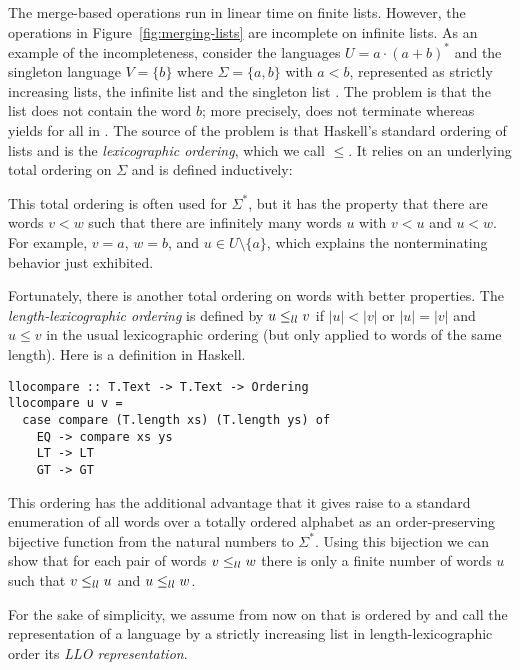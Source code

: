 The merge-based operations run in linear time on finite
lists. However, the operations in Figure~\ref{fig:merging-lists} are
incomplete on infinite lists. As 
an example of the incompleteness, consider the languages $U = a\cdot
(a+b)^*$ and the singleton language $V = \{b\}$ where $\Sigma = \{a, b\}$
with $a<b$, represented as strictly increasing lists, the infinite
list  and the singleton list . The problem is that
the list  does not contain the word $b$; more
precisely,  does not
terminate whereas  yields  for
all  in . The source 
of the problem is that Haskell's standard ordering of lists and
 is the \emph{lexicographic ordering}, which we call
$\le$. It relies on an underlying total ordering on $\Sigma$ and is
defined inductively:
\begin{mathpar}
  

\end{mathpar}

This total ordering
is often used for $\Sigma^*$, but it has the property that
there are words $v<w$ such that there are infinitely many words $u$
with $v<u$ and $u<w$. For example, $v=a$, $w=b$, and $u\in U \setminus
\{a\}$, which explains the nonterminating behavior just exhibited.

Fortunately, there is another total ordering on words with better
properties. The
\emph{length-lexicographic ordering} is defined by $u \lleq 
v$ if $|u|<|v|$ or $|u|=|v|$ and $u\le v$ in the usual lexicographic
ordering (but only applied to words of the same length). Here is a definition in Haskell.
\begin{lstlisting}
llocompare :: T.Text -> T.Text -> Ordering
llocompare u v =
  case compare (T.length xs) (T.length ys) of
    EQ -> compare xs ys
    LT -> LT
    GT -> GT
\end{lstlisting}
This ordering has the additional advantage that it gives raise to a standard
enumeration of all words over a totally ordered alphabet as an order-preserving
bijective function from the natural numbers to $\Sigma^*$. Using this
bijection we can show that for each pair of words $v \lleq w$ there is only a finite
number of words $u$ such that $v \lleq u$ and $u \lleq w$. 

For the sake of simplicity, we assume from now on that 
is ordered by  and call the representation of a
language by a strictly increasing list in length-lexicographic order
its \emph{LLO representation}. 


